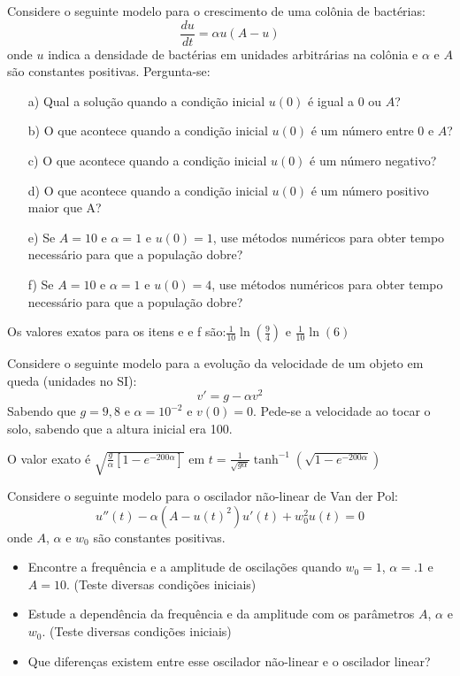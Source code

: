 \begin{exer} Considere o seguinte modelo para o crescimento de uma colônia de bactérias:
$$\frac{du}{dt}=\alpha u (A-u)$$
onde $u$ indica a densidade de bactérias em unidades arbitrárias na colônia e $\alpha$ e $A$ são constantes positivas.
Pergunta-se:
\begin{itemize}
\item[a)] Qual a solução quando a condição inicial $u(0)$ é igual a $0$ ou $A$?
\item[b)] O que acontece quando a condição inicial $u(0)$ é um número entre $0$ e $A$?
\item[c)] O que acontece quando a condição inicial $u(0)$ é um número negativo?
\item[d)] O que acontece quando a condição inicial $u(0)$ é um número positivo maior que A?
\item[e)] Se $A=10$ e $\alpha=1$ e $u(0)=1$, use métodos numéricos para obter tempo necessário para que a população dobre?
\item[f)] Se $A=10$ e $\alpha=1$ e $u(0)=4$, use métodos numéricos para obter tempo necessário para que a população dobre?
\end{itemize}
\end{exer}
\begin{resp}

Os valores exatos para os itens e e f são:$\frac{1}{10}\ln\left(\frac{9}{4}\right)$ e $\frac{1}{10}\ln\left(6\right)$

\end{resp}

\begin{exer} Considere o seguinte modelo para a evolução da velocidade de um objeto em queda (unidades no SI):
$$v'=g-\alpha v^2$$
Sabendo que $g=9,8$ e $\alpha=10^{-2}$ e $v(0)=0$. Pede-se a velocidade ao tocar o solo, sabendo que a altura inicial era 100.

\end{exer}
\begin{resp}

O valor exato é $\sqrt{\frac{g}{\alpha}\left[1-e^{{-200\alpha}}\right]}$ em $t=\frac{1}{\sqrt{g\alpha}}\tanh^{-1}\left(\sqrt{1-e^{{-200\alpha}}}\right)$

\end{resp}


\begin{exer} Considere o seguinte modelo para o oscilador não-linear de Van der Pol:
$$u''(t) - \alpha (A-u(t)^2)u'(t) + w_0^2u(t)=0$$
onde $A$, $\alpha$ e $w_0$ são constantes positivas.
\begin{itemize}
\item Encontre a frequência e a amplitude de oscilações quando $w_0=1$, $\alpha=.1$ e $A=10$. (Teste diversas condições iniciais)
\item Estude a dependência da frequência e da amplitude com os parâmetros  $A$, $\alpha$ e $w_0$. (Teste diversas condições iniciais)
\item Que diferenças existem entre esse oscilador não-linear e o oscilador linear?
\end{itemize}
\end{exer}

